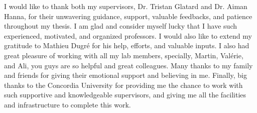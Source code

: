 \begin{acknowledgments}
I would like to thank both my supervisors, Dr. Tristan Glatard and Dr. Aiman Hanna,
for their unwavering guidance, support, valuable feedbacks, and patience throughout
my thesis. I am glad and consider myself lucky that I have such experienced, motivated,
and organized professors. I would also like to extend my gratitude to Mathieu Dugr\'e for his help,
efforts, and valuable inputs. I also had great pleasure of working with all my lab members,
specially, Martin, Val\'erie, and Ali, you guys are so helpful and great colleagues.
Many thanks to my family and friends for giving their emotional support and believing in me.
Finally, big thanks to the Concordia University for providing me the chance to work
with such supportive and knowledgeable supervisors, and giving me all the
facilities and infrastructure to complete this work.
\end{acknowledgments}
